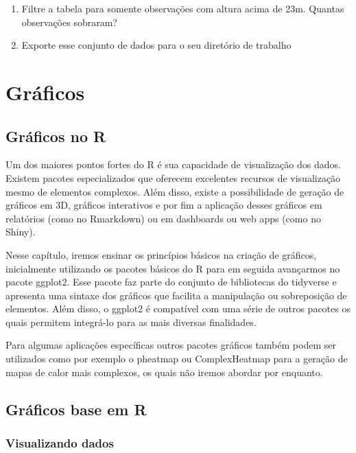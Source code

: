 \documentclass[
]{book}
\providecommand{\tightlist}{%
  \setlength{\itemsep}{0pt}\setlength{\parskip}{0pt}}
\begin{document}
\begin{enumerate}
\def\labelenumi{\arabic{enumi}.}
\setcounter{enumi}{2}
\tightlist
\item
  Filtre a tabela para somente observações com altura acima de 23m. Quantas observações sobraram?
\item
  Exporte esse conjunto de dados para o seu diretório de trabalho
\end{enumerate}

\hypertarget{gruxe1ficos}{%
\chapter{Gráficos}\label{gruxe1ficos}}

\hypertarget{gruxe1ficos-no-r}{%
\section{Gráficos no R}\label{gruxe1ficos-no-r}}

Um dos maiores pontos fortes do R é sua capacidade de visualização dos dados. Existem pacotes especializados que oferecem excelentes recursos de visualização mesmo de elementos complexos. Além disso, existe a possibilidade de geração de gráficos em 3D, gráficos interativos e por fim a aplicação desses gráficos em relatórios (como no Rmarkdown) ou em dashboards ou web apps (como no Shiny).

Nesse capítulo, iremos ensinar os princípios básicos na criação de gráficos, inicialmente utilizando os pacotes básicos do R para em seguida avançarmos no pacote ggplot2. Esse pacote faz parte do conjunto de bibliotecas do tidyverse e apresenta uma sintaxe dos gráficos que facilita a manipulação ou sobreposição de elementos. Além disso, o ggplot2 é compatível com uma série de outros pacotes os quais permitem integrá-lo para as mais diversas finalidades.

Para algumas aplicações específicas outros pacotes gráficos também podem ser utilizados como por exemplo o pheatmap ou ComplexHeatmap para a geração de mapas de calor mais complexos, os quais não iremos abordar por enquanto.

\hypertarget{gruxe1ficos-base-em-r}{%
\section{Gráficos base em R}\label{gruxe1ficos-base-em-r}}

\hypertarget{visualizando-dados}{%
\subsection{Visualizando dados}\label{visualizando-dados}}
\end{document}
